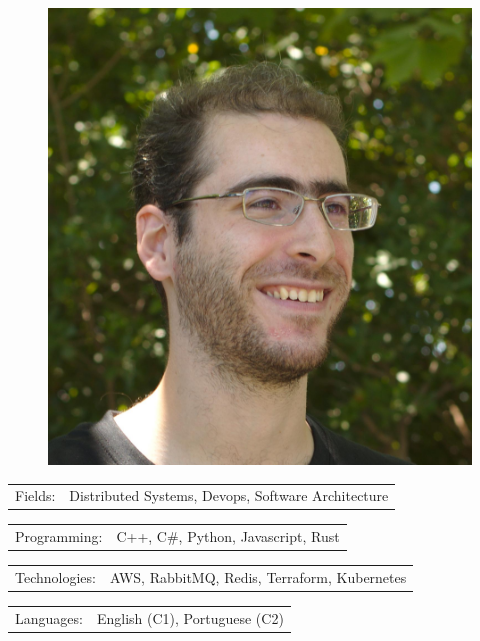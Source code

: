 \documentclass[10pt,A4]{article}
\newcommand{\tzlarrow}{(0,0) -- (0.2,0) -- (0.3,0.2) -- (0.2,0.4) -- (0,0.4) -- (0.1,0.2) -- cycle;}
\newcommand{\larrow}[1]
{\begin{tikzpicture}[scale=0.58]
	 \filldraw[fill=#1!100,draw=#1!100!black]  \tzlarrow
 \end{tikzpicture}
}
\newcommand{\metasection}[2]
{
\begin{tabular*}{1\textwidth}{p{2.6cm} p{11cm}}
\larrow{bgcol}	\normalsize{\textcolor{sectcol}{#1}}&#2\\[6pt]
\end{tabular*}
}
\begin{document}
\pagestyle{fancy}	


\vspace{-20.55pt}

\hspace{-0.25\linewidth}\colorbox{bgcol}{}



\begin{figure}[H]
\begin{flushright}
	\includegraphics[clip,width=0.2\linewidth]{myfoto.jpg}	%
\end{flushright}
\end{figure}



\vspace{-114pt}

\metasection{Fields:}{Distributed Systems, Devops, Software Architecture} 
\metasection{Programming:}{C++, C\#, Python, Javascript, Rust}
\metasection{Technologies:}{AWS, RabbitMQ, Redis, Terraform, Kubernetes}
\metasection{Languages:}{English (C1), Portuguese (C2)}
\end{document}
